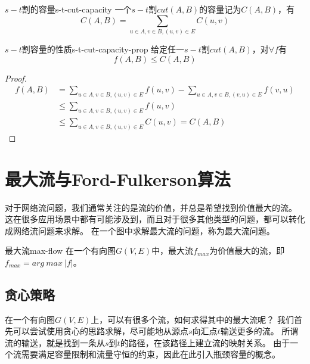 \begin{definition}{\(s-t\)割的容量}{s-t-cut-capacity}
	一个\(s-t\)割\(cut(A, B)\)的容量记为\(C(A, B)\)，有
	\begin{equation}
		C(A,B) = \sum_{u \in A, v \in B, (u,v) \in E} C(u,v)
	\end{equation}
\end{definition}

\begin{proposition}{\(s-t\)割容量的性质}{s-t-cut-capacity-prop}
	给定任一\(s-t\)割\(cut(A, B)\)，对\(\forall f\)有
	\begin{equation}
		f(A,B) \le C(A, B)
	\end{equation}
\end{proposition}

\begin{proof}
	\begin{equation}\nonumber
		\begin{split}
		f(A,B)& = \sum_{u \in A, v \in B, (u,v) \in E} f(u,v) - \sum_{u \in A, v \in B, (v,u) \in E} f(v,u) \\
			& \le \sum_{u \in A, v \in B, (u,v) \in E} f(u,v) \\
			& \le \sum_{u \in A, v \in B, (u,v) \in E} C(u,v) = C(A,B)
		\end{split}
	\end{equation}
\end{proof}


\section{最大流与Ford-Fulkerson算法}

	\par 对于网络流问题，我们通常关注的是流的价值，并总是希望找到价值最大的流。
	这在很多应用场景中都有可能涉及到，而且对于很多其他类型的问题，都可以转化成网络流问题来求解。
	在一个图中求解最大流的问题，称为最大流问题。

\begin{definition}{最大流}{max-flow}
	在一个有向图\(G(V, E)\)中，最大流\(f_{max}\)为价值最大的流，即\(f_{max} = arg\ max\ |f|\)。
\end{definition}

\subsection{贪心策略}

	\par 在一个有向图\(G(V, E)\)上，可以有很多个流，如何求得其中的最大流呢？
	我们首先可以尝试使用贪心的思路求解，尽可能地从源点\(s\)向汇点\(t\)输送更多的流。
	所谓流的输送，就是找到一条从\(s\)到\(t\)的路径，在该路径上建立流的映射关系。
	由于一个流需要满足容量限制和流量守恒的约束，因此在此引入瓶颈容量的概念。

